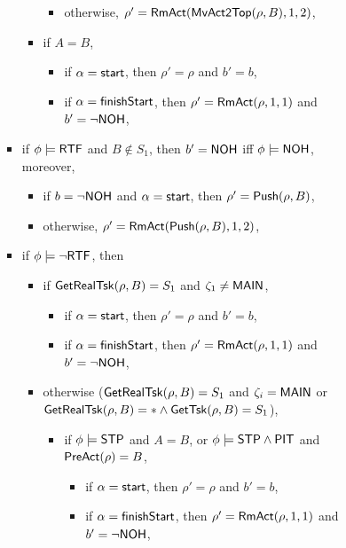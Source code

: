 \begin{itemize}
\begin{itemize}
\begin{itemize}
\begin{itemize}
\begin{itemize}
\begin{itemize}
\begin{itemize}
\begin{itemize}
							\item otherwise, $\rho' = \mathsf{RmAct}(\mathsf{MvAct2Top}(\rho, B), 1, 2)$,
						\end{itemize}
                					\item if $A = B$, 
									\begin{itemize}
										\item if $\alpha = {\mathsf{start} }$, then $\rho' = \rho$ and $b' = b$,
										\item if $\alpha = {\mathsf{finishStart} }$, then $\rho' = \mathsf{RmAct}(\rho, 1, 1)$ and $b' = \neg{\sf NOH}$,
									\end{itemize}
                				\end{itemize}
					\item if $\phi \models {\sf RTF}$ and $B \notin S_1$, then $b' = {\sf NOH}$ iff $\phi \models {\sf NOH}$, moreover,
					\begin{itemize}
						\item if $b = \neg {\sf NOH}$ and $\alpha = {\mathsf{start} }$, then $\rho'=\mathsf{Push}(\rho, B)$,
						\item otherwise, $\rho' = \mathsf{RmAct}(\mathsf{Push}(\rho, B), 1, 2)$, 
					\end{itemize}
					\item if $\phi \models \neg {\sf RTF}$, then
					\begin{itemize}
						\item if $\mathsf{GetRealTsk}(\rho,B) = S_1$ and $\zeta_1 \neq {\sf MAIN}$, 
							\begin{itemize}
								\item if $\alpha = {\mathsf{start} }$, then $\rho' = \rho$ and $b' = b$,
								\item if $\alpha = {\mathsf{finishStart} }$, then $\rho' = \mathsf{RmAct}(\rho, 1, 1)$ and $b' = \neg{\sf NOH}$,
							\end{itemize}
						\item otherwise ($\mathsf{GetRealTsk}(\rho,B) = S_1$ and $\zeta_i = {\sf MAIN}$ or $\mathsf{GetRealTsk}(\rho,B) = * \wedge\mathsf{GetTsk}(\rho,B) = S_1$), 
						\begin{itemize}
							\item if $\phi\models{\sf STP}$ and $A = B$, or $\phi \models{\sf STP}\wedge{\sf PIT}$ and $\mathsf{PreAct}(\rho) = B$, 
							\begin{itemize}
								\item if $\alpha = {\mathsf{start} }$, then $\rho' = \rho$ and $b' = b$,
								\item if $\alpha = {\mathsf{finishStart} }$, then $\rho' = \mathsf{RmAct}(\rho, 1, 1)$ and $b' = \neg{\sf NOH}$,
							\end{itemize}

\end{itemize}
\end{itemize}
\end{itemize}
\end{itemize}
\end{itemize}
\end{itemize}
\end{itemize}
\end{itemize}
